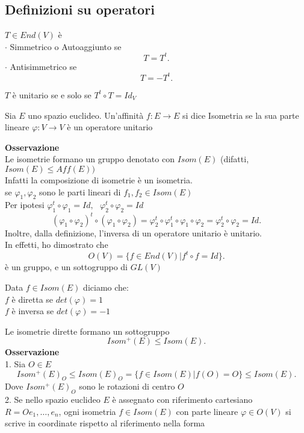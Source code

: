 \documentclass[12px]{article}
\begin{document}
	\subsection{Definizioni su operatori}
	\begin{defi}
		$T\in End(V)$ è \\
		$\cdot$ Simmetrico o Autoaggiunto se
		\[
		T = T^t
		.\] 
		$\cdot$ Antisimmetrico se
		\[
		T = -T^t
		.\] 
	\end{defi}
	\begin{prop}
		$T$ è unitario se e solo se $T^t\circ T = Id_V$
	\end{prop}
	\begin{defi}
		Sia $E$ uno spazio euclideo. Un'affinità $f:E \rightarrow E$ si dice Isometria se la sua parte lineare $\varphi: V \rightarrow V$ è un operatore unitario
	\end{defi}
	\textbf{Osservazione}\\
	Le isometrie formano un gruppo denotato con $Isom(E)$ (difatti, $Isom(E) \leq Aff(E))$\\
	Infatti la composizione di isometrie è un isometria.\\
	se $\varphi_1,\varphi_2$ sono le parti lineari di $f_1,f_2\in Isom(E)$\\
	Per ipotesi $\varphi_1^t\circ \varphi_1 = Id, \ \ \ \varphi_2^t\circ \varphi_2 = Id$ \\
	\[
		(\varphi_1\circ \varphi_2)^t\circ(\varphi_1\circ \varphi_2) = \varphi_2^t\circ \varphi_1^t\circ \varphi_1\circ \varphi_2 = \varphi_2^t\circ \varphi_2 = Id
	.\] 
	Inoltre, dalla definizione, l'inversa di un operatore unitario è unitario.\\
	In effetti, ho dimostrato che 
	\[
		O(V) = \{f\in End(V)|f^t\circ f = Id\}
	.\] 
	è un gruppo, e un sottogruppo di $GL(V)$\\
 \begin{nome}
 	Data $f\in Isom(E)$ diciamo che:\\
	$f$ è diretta se $det(\varphi) = 1$ \\
	$f$ è inversa se $det(\varphi) = -1$
 \end{nome}
 Le isometrie dirette formano un sottogruppo
 \[
 Isom^+(E)\leq Isom(E)
 .\] 
 \textbf{Osservazione}
\\
1. Sia $O\in E$ 
\[
 Isom^+(E)_O\leq Isom(E)_O = \{f\in Isom(E)|f(O) = O\} \leq Isom(E)
.\] 
Dove $Isom^+(E)_O$ sono le rotazioni di centro $O$ \\
2. Se nello spazio euclideo $E$ è assegnato con riferimento cartesiano $R = Oe_1,\ldots,e_n$, ogni isometria $f\in Isom(E)$ con parte lineare $\varphi\in O(V)$ si scrive in coordinate rispetto al riferimento nella forma
\end{document}

